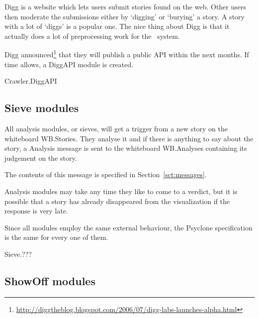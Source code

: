 Digg is a website which lets users submit stories found on the web. Other users
then moderate the submissions either by `digging' or `burying' a story. A story
with a lot of `diggs' is a popular one. The nice thing about Digg is that it
actually does a lot of preprocessing work for the \Amber\ system.

Digg
announced\footnote{\url{http://diggtheblog.blogspot.com/2006/07/digg-labs-launches-alpha.html}}
that they will publish a public API within the next months. If time allows, a
DiggAPI module is created.

\begin{module}{Crawler.DiggAPI}
\end{module}

% 
% 


\subsection{Sieve modules}

All analysis modules, or sieves, will get a trigger from a new story on the
whiteboard WB.Stories. They analyse it and if there is anything to say about
the story, a Analysis message is sent to the whiteboard WB.Analyses containing
its judgement on the story.

The contents of this message is specified in Section~\ref{sct:messages}.

Analysis modules may take any time they like to come to a verdict, but it is
possible that a story has already disappeared from the visualization if the
response is very late.

Since all modules employ the same external behaviour, the Psyclone
specification is the same for every one of them.

\begin{module}{Sieve.???}
\end{module}

\subsection{ShowOff modules}

